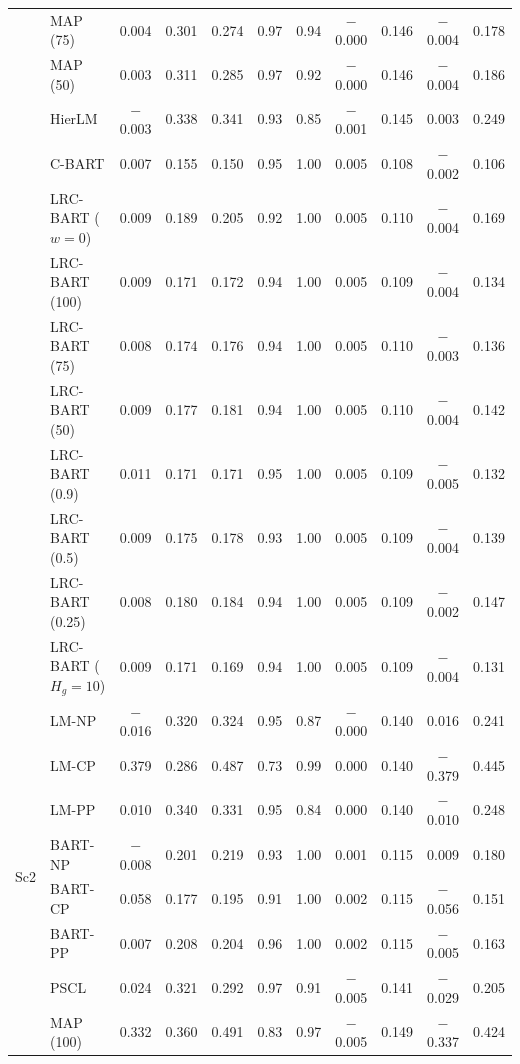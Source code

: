 \begin{center}
\begin{longtable}{llccccccccc}
& MAP (75) & 0.004 & 0.301 & 0.274 & 0.97 & 0.94 & $-$0.000 & 0.146 & $-$0.004 & 0.178 \\
& MAP (50) & 0.003 & 0.311 & 0.285 & 0.97 & 0.92 & $-$0.000 & 0.146 & $-$0.004 & 0.186 \\
& HierLM & $-$0.003 & 0.338 & 0.341 & 0.93 & 0.85 & $-$0.001 & 0.145 & 0.003 & 0.249 \\
& C-BART & 0.007 & 0.155 & 0.150 & 0.95 & 1.00 & 0.005 & 0.108 & $-$0.002 & 0.106 \\
& LRC-BART ($w=0$) & 0.009 & 0.189 & 0.205 & 0.92 & 1.00 & 0.005 & 0.110 & $-$0.004 & 0.169 \\
& LRC-BART (100) & 0.009 & 0.171 & 0.172 & 0.94 & 1.00 & 0.005 & 0.109 & $-$0.004 & 0.134 \\
& LRC-BART (75) & 0.008 & 0.174 & 0.176 & 0.94 & 1.00 & 0.005 & 0.110 & $-$0.003 & 0.136 \\
& LRC-BART (50) & 0.009 & 0.177 & 0.181 & 0.94 & 1.00 & 0.005 & 0.110 & $-$0.004 & 0.142 \\
& LRC-BART (0.9) & 0.011 & 0.171 & 0.171 & 0.95 & 1.00 & 0.005 & 0.109 & $-$0.005 & 0.132 \\
& LRC-BART (0.5) & 0.009 & 0.175 & 0.178 & 0.93 & 1.00 & 0.005 & 0.109 & $-$0.004 & 0.139 \\
& LRC-BART (0.25) & 0.008 & 0.180 & 0.184 & 0.94 & 1.00 & 0.005 & 0.109 & $-$0.002 & 0.147 \\
& LRC-BART ($H_g=10$) & 0.009 & 0.171 & 0.169 & 0.94 & 1.00 & 0.005 & 0.109 & $-$0.004 & 0.131 \\
\midrule
\multirow{20}{*}{Sc2} & LM-NP & $-$0.016 & 0.320 & 0.324 & 0.95 & 0.87 & $-$0.000 & 0.140 & 0.016 & 0.241 \\
& LM-CP & 0.379 & 0.286 & 0.487 & 0.73 & 0.99 & 0.000 & 0.140 & $-$0.379 & 0.445 \\
& LM-PP & 0.010 & 0.340 & 0.331 & 0.95 & 0.84 & 0.000 & 0.140 & $-$0.010 & 0.248 \\
& BART-NP & $-$0.008 & 0.201 & 0.219 & 0.93 & 1.00 & 0.001 & 0.115 & 0.009 & 0.180 \\
& BART-CP & 0.058 & 0.177 & 0.195 & 0.91 & 1.00 & 0.002 & 0.115 & $-$0.056 & 0.151 \\
& BART-PP & 0.007 & 0.208 & 0.204 & 0.96 & 1.00 & 0.002 & 0.115 & $-$0.005 & 0.163 \\
& PSCL & 0.024 & 0.321 & 0.292 & 0.97 & 0.91 & $-$0.005 & 0.141 & $-$0.029 & 0.205 \\
& MAP (100) & 0.332 & 0.360 & 0.491 & 0.83 & 0.97 & $-$0.005 & 0.149 & $-$0.337 & 0.424 \\

\end{longtable}
\end{center}
